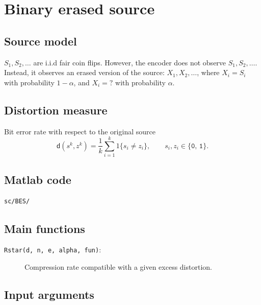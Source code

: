 \documentclass[a4paper,11p]{memoir}
\begin{document}
\section{Binary erased source}

\subsection{Source model}
$ S_1, S_2, \ldots $ are i.i.d fair coin flips. However, the encoder does not observe $S_1, S_2, \ldots$. Instead, it observes an erased version of the source: $X_1, X_2, \ldots$, where $X_i = S_i$ with probability $1 - \alpha$, and $X_i = \texttt{?}$ with probability $\alpha$.    

\subsection{Distortion measure}
Bit error rate with respect to the original source$$\mathsf d(s^k, z^k) = \frac 1 k \sum_{i = 1}^k 1\{s_i \neq z_i\}, \qquad s_i, z_i \in \{ \texttt{0, 1} \}. $$

\subsection{Matlab code}
 \verb|sc/BES/|


\subsection{Main functions}
\begin{description}
\item[\texttt{Rstar(d, n, e, alpha, fun)}:]  Compression rate compatible with a given excess distortion. 
\end{description}

\subsection{Input arguments}
\end{document}
